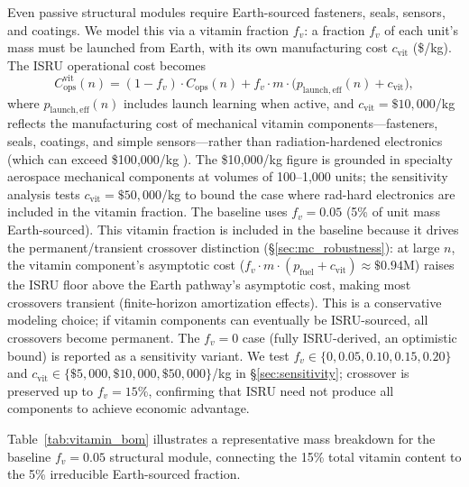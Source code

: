 \documentclass[preprint,12pt]{elsarticle}
\begin{document}
Even passive structural modules require Earth-sourced fasteners, seals, sensors, and coatings. We model this via a vitamin fraction $f_v$: a fraction $f_v$ of each unit's mass must be launched from Earth, with its own manufacturing cost $c_{\mathrm{vit}}$ (\$/kg). The ISRU operational cost becomes
\begin{equation}
  C_{\mathrm{ops}}^{\mathrm{vit}}(n) = (1 - f_v) \cdot C_{\mathrm{ops}}(n) + f_v \cdot m \cdot \bigl(p_{\mathrm{launch,eff}}(n) + c_{\mathrm{vit}}\bigr),
  \label{eq:vitamin}
\end{equation}
where $p_{\mathrm{launch,eff}}(n)$ includes launch learning when active, and $c_{\mathrm{vit}} = \$10{,}000$/kg reflects the manufacturing cost of mechanical vitamin components---fasteners, seals, coatings, and simple sensors---rather than radiation-hardened electronics (which can exceed \$100{,}000/kg \cite{wertz2011}). The \$10{,}000/kg figure is grounded in specialty aerospace mechanical components at volumes of 100--1{,}000 units; the sensitivity analysis tests $c_{\mathrm{vit}} = \$50{,}000$/kg to bound the case where rad-hard electronics are included in the vitamin fraction. The baseline uses $f_v = 0.05$ (5\% of unit mass Earth-sourced). This vitamin fraction is included in the baseline because it drives the permanent/transient crossover distinction (\S\ref{sec:mc_robustness}): at large $n$, the vitamin component's asymptotic cost ($f_v \cdot m \cdot (p_{\mathrm{fuel}} + c_{\mathrm{vit}}) \approx \$0.94$M) raises the ISRU floor above the Earth pathway's asymptotic cost, making most crossovers transient (finite-horizon amortization effects). This is a conservative modeling choice; if vitamin components can eventually be ISRU-sourced, all crossovers become permanent. The $f_v = 0$ case (fully ISRU-derived, an optimistic bound) is reported as a sensitivity variant. We test $f_v \in \{0, 0.05, 0.10, 0.15, 0.20\}$ and $c_{\mathrm{vit}} \in \{\$5{,}000, \$10{,}000, \$50{,}000\}$/kg in \S\ref{sec:sensitivity}; crossover is preserved up to $f_v = 15\%$, confirming that ISRU need not produce all components to achieve economic advantage.

Table~\ref{tab:vitamin_bom} illustrates a representative mass breakdown for the baseline $f_v = 0.05$ structural module, connecting the 15\% total vitamin content to the 5\% irreducible Earth-sourced fraction.
\end{document}
